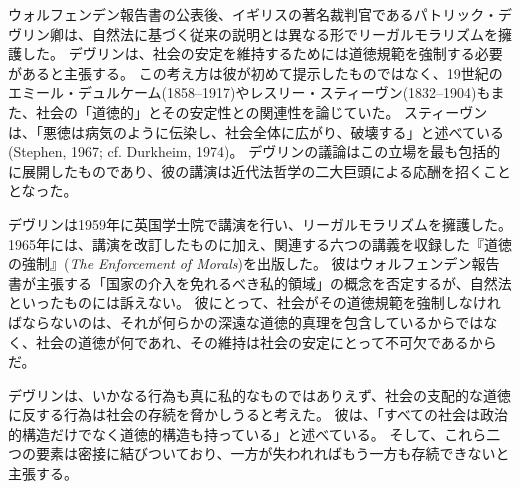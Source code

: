 \documentclass[paper=a4,book,openany]{jlreq}
\newcommand{\ig}[1]{}           %
\begin{document}
ウォルフェンデン報告書の公表後、イギリスの著名裁判官であるパトリック・デヴリン\ig{Patrick Devlin}卿は、自然法に基づく従来の説明とは異なる形でリーガルモラリズムを擁護した。
デヴリン\ig{Patrick Devlin}は、社会の安定を維持するためには道徳規範を強制する必要があると主張する。
この考え方は彼が初めて提示したものではなく、19世紀のエミール・デュルケーム(1858--1917)やレスリー・スティーヴン(1832--1904)もまた、社会の「道徳的」とその安定性との関連性を論じていた。
スティーヴンは、「悪徳は病気のように伝染し、社会全体に広がり、破壊する」と述べている(Stephen, 1967; cf. Durkheim, 1974)。
\nocite{stephen67:liberty}\nocite{durkheim74:sociology}
デヴリン\ig{Patrick Devlin}の議論はこの立場を最も包括的に展開したものであり、彼の講演は近代法哲学の二大巨頭による応酬を招くこととなった。

デヴリン\ig{Patrick Devlin}は1959年に英国学士院で講演を行い、リーガルモラリズムを擁護した。
1965年には、講演を改訂したものに加え、関連する六つの講義を収録した『道徳の強制』(\emph{The Enforcement of Morals})を出版した。
彼はウォルフェンデン報告書が主張する「国家の介入を免れるべき私的領域」の概念を否定するが、自然法といったものには訴えない。
彼にとって、社会がその道徳規範を強制しなければならないのは、それが何らかの深遠な道徳的真理を包含しているからではなく、社会の道徳が何であれ、その維持は社会の安定にとって不可欠であるからだ。

デヴリン\ig{Patrick Devlin}は、いかなる行為も真に私的なものではありえず、社会の支配的な道徳に反する行為は社会の存続を脅かしうると考えた。
彼は、「すべての社会は政治的構造だけでなく道徳的構造も持っている」と述べている\citep[p.9]{devlin65:_enfor_moral}。
そして、これら二つの要素は密接に結びついており、一方が失われればもう一方も存続できないと主張する。
\end{document}
